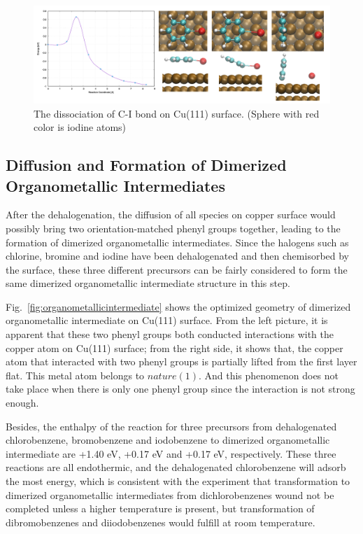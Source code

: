 \documentclass[%
 reprint,
 amsmath,amssymb,
 aps,
prb,
]{revtex4-1}
\begin{document}
\begin{figure}[hbt]
\centering
\includegraphics[width=1.0\textwidth]{Fig/dissociation_I.png}
\caption{The dissociation of C-I bond on Cu(111) surface. (Sphere with red color is iodine atoms)}
\label{fig:dissociation_I}
\end{figure}

\subsection{Diffusion and Formation of Dimerized Organometallic Intermediates}

After the dehalogenation, the diffusion of all species on copper surface would possibly bring two orientation-matched phenyl groups together, leading to the formation of dimerized organometallic intermediates. Since the halogens such as chlorine, bromine and iodine have been dehalogenated and then chemisorbed by the surface, these three different precursors can be fairly considered to form the same dimerized organometallic intermediate structure in this step.

Fig.~\ref{fig:organometallicintermediate} shows the optimized geometry of dimerized organometallic intermediate on Cu(111) surface. From the left picture, it is apparent that these two phenyl groups both conducted interactions with the copper atom on Cu(111) surface; from the right side, it shows that, the copper atom that interacted with two phenyl groups is partially lifted from the first layer flat. This metal atom belongs to $nature(1)$. And this phenomenon does not take place when there is only one phenyl group since the interaction is not strong enough. 

Besides, the enthalpy of the reaction for three precursors from dehalogenated chlorobenzene, bromobenzene and iodobenzene to dimerized organometallic intermediate are +1.40 eV, +0.17 eV and +0.17 eV, respectively. These three reactions are all endothermic, and the dehalogenated chlorobenzene will adsorb the most energy, which is consistent with the experiment that transformation to dimerized organometallic intermediates from dichlorobenzenes wound not be completed unless a higher temperature is present, but transformation of dibromobenzenes and diiodobenzenes would fulfill at room temperature.
\end{document}
